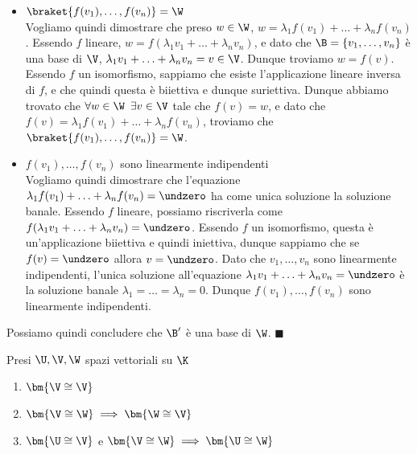 \documentclass[11pt, a4paper, titlepage, oneside]{scrbook}
\begin{document}
\Dimostrazione \nopagebreak

\begin{itemize}
    \item $\braket{f(v_1), \ldots, f(v_n)} = \W$ \\
    Vogliamo quindi dimostrare che preso $w \in \W$, $w = \lambda_1 f(v_1) + \ldots + \lambda_n f(v_n)$. Essendo $f$ lineare, $w = f(\lambda_1 v_1 + \ldots + \lambda_n v_n)$, e dato che $\B = \{v_1, \ldots, v_n\}$ è una base di $\V$, $\lambda_1 v_1 + \ldots + \lambda_n v_n = v \in \V$. Dunque troviamo $w = f(v)$. Essendo $f$ un isomorfismo, sappiamo che esiste l'applicazione lineare inversa di $f$, e che quindi questa è biiettiva e dunque suriettiva. Dunque abbiamo trovato che $\forall w \in \W \enspace \exists v \in \V$ tale che $f(v) = w$, e dato che $f(v) = \lambda_1 f(v_1) + \ldots + \lambda_n f(v_n)$, troviamo che $\braket{f(v_1), \ldots, f(v_n)} = \W$.
    \item $f(v_1), \ldots, f(v_n)$ sono linearmente indipendenti \\
    Vogliamo quindi dimostrare che l'equazione $\lambda_1 f(v_1) + \ldots + \lambda_n f(v_n) = \undzero$ ha come unica soluzione la soluzione banale. Essendo $f$ lineare, possiamo riscriverla come $f(\lambda_1 v_1 + \ldots + \lambda_n v_n) = \undzero$. Essendo $f$ un isomorfismo, questa è un'applicazione biiettiva e quindi iniettiva, dunque sappiamo che se $f(v) = \undzero$ allora $v = \undzero$. Dato che $v_1, \ldots, v_n$ sono linearmente indipendenti, l'unica soluzione all'equazione $\lambda_1 v_1 + \ldots + \lambda_n v_n = \undzero$ è la soluzione banale $\lambda_1 = \ldots = \lambda_n = 0$. Dunque $f(v_1), \ldots, f(v_n)$ sono linearmente indipendenti.
\end{itemize}
Possiamo quindi concludere che $\B'$ è una base di $\W$. $\blacksquare$

\begin{Proprieta}
\label{prop-isomorfismi}
Presi $\U, \V, \W$ spazi vettoriali su $\K$
\begin{enumerate}
    \item $\bm{\V \cong \V}$
    \item $\bm{\V \cong \W} \implies \bm{\W \cong \V}$
    \item $\bm{\U \cong \V}$ e $\bm{\V \cong \W} \implies \bm{\U \cong \W}$
\end{enumerate}
\end{Proprieta}

\Dimostrazione \nopagebreak
\end{document}
